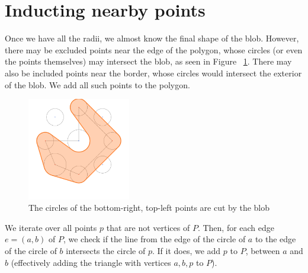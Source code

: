 \documentclass[paper=a4, fontsize=11pt]{scrartcl} %
\numberwithin{equation}{section} %
\numberwithin{figure}{section} %
\numberwithin{table}{section} %
\begin{document}
\section{Inducting nearby points}
Once we have all the radii, we almost know the final shape of the blob. However,
there may be excluded points near the edge of the polygon, whose circles (or
even the points themselves) may intersect the blob, as seen in
Figure ~\ref{fig:whyrefine}. There may also be included points near the border,
whose circles would intersect the exterior of the blob.  We add all such points
to the polygon. \\

\begin{figure}[h]
\includegraphics[width=0.4\textwidth]{whyrefine}
\centering
\caption{The circles of the bottom-right, top-left points are cut by the blob}
\label{fig:whyrefine}
\end{figure}

We iterate over all points $p$ that are not vertices of $P$. Then, for each edge
$e = (a,b)$ of $P$, we check if the line from the edge of the circle of $a$ to
the edge of the circle of $b$ intersects the circle of $p$. If it does, we add
$p$ to $P$, between $a$ and $b$ (effectively adding the triangle with vertices
$a,b,p$ to $P$). \\
\end{document}
